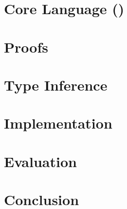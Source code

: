 \documentclass[master=ecws, masteroption=ai]{kulemt} %
\let\section\chapter
\begin{document}
\section{Core Language (\core)}



% 



\section{Proofs}


\section{Type Inference}
% 
% 




\section{Implementation}


\section{Evaluation}


\section{Conclusion}


\appendixpage*          %
\appendix
% 

\backmatter



\nocite{*}
\end{document}
